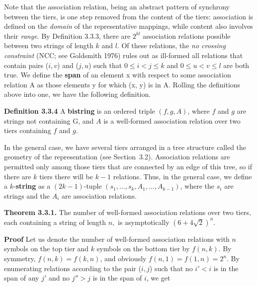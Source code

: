 Note that the association relation, being an abstract pattern of synchrony
between the tiers, is one step removed from the content of the tiers:
association is defined on the {\it domain} of the representative mappings,
while content also involves their {\it range}.  By Definition 3.3.3, there are
$2^{kl}$ association relations possible between two strings of length $k$ and
$l$. Of these relations, the {\it no crossing constraint} (NCC; see Goldsmith
1976) \nocite{Goldsmith:1976} rules out as ill-formed all relations that
contain pairs ($i,v$) and ($j,u$) such that $0\leq i < j \leq k$ and $0\leq u
< v \leq l$ are both true.  We define the
{\bf span} of an element x with respect to some association relation A as
those elements y for which (x, y) is in A. Rolling the
definitions above into one, we have the following definition.

\smallskip\noindent
{\bf Definition 3.3.4} A {\bf bistring} is an ordered triple $(f,g,A)$, where
$f$ and $g$ are strings not containing G, and $A$ is a well-formed association
relation over two tiers containing $f$ and $g$. 

In the general case, we have several tiers arranged in a tree structure called
the geometry of the representation (see Section~3.2). Association relations
are permitted only among those tiers that are connected by an edge of this
tree, so if there are $k$ tiers there will be $k-1$ relations. Thus, in the
general case, we define a $k$-{\bf string} as a $(2k-1)$-tuple
$(s_1,...,s_{k}, A_1, \ldots, A_{k-1})$, where the $s_i$ are strings and the
$A_i$ are association relations. 

\smallskip\noindent
{\bf Theorem 3.3.1.} The number of well-formed association relations over
two tiers, each containing a string of length $n,$ is asymptotically
$(6+4 \sqrt{2})^n$. 

\smallskip\noindent
{\bf Proof} Let us denote the number of well-formed association relations
with $n$ symbols on the top tier and $k$ symbols on the bottom tier by
$f(n,k)$. By symmetry, $f(n,k)=f(k,n)$, and obviously $f(n,1)=f(1,n)=2^n$. By
enumerating relations according to the pair ($i,j$) such that no $i'<i$ is in
the span of any $j'$ and no $j'' >j$ is in the span of $i$, we get

